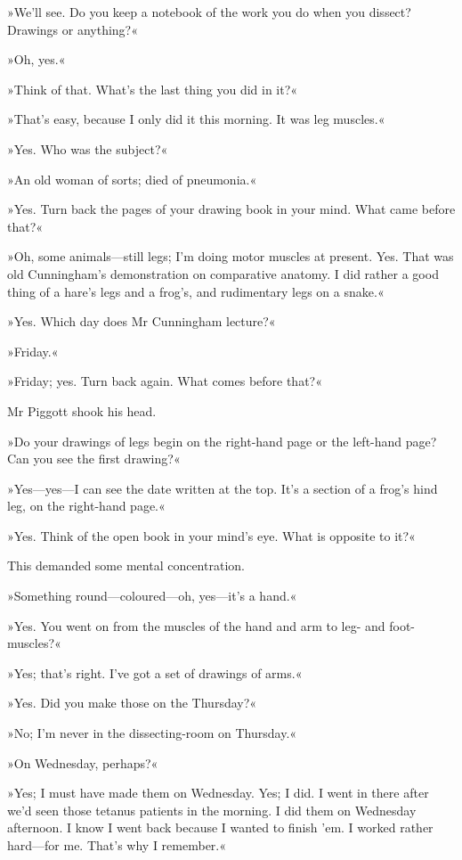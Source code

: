 »We'll see. Do you keep a notebook of the work you do when you dissect? Drawings or anything?«

»Oh, yes.«

»Think of that. What's the last thing you did in it?«

»That's easy, because I only did it this morning. It was leg muscles.«

»Yes. Who was the subject?«

»An old woman of sorts; died of pneumonia.«

»Yes. Turn back the pages of your drawing book in your mind. What came before that?«

»Oh, some animals—still legs; I'm doing motor muscles at present. Yes. That was old Cunningham's demonstration on comparative anatomy. I did rather a good thing of a hare's legs and a frog's, and rudimentary legs on a snake.«

»Yes. Which day does Mr Cunningham lecture?«

»Friday.«

»Friday; yes. Turn back again. What comes before that?«

Mr Piggott shook his head.

»Do your drawings of legs begin on the right-hand page or the left-hand page? Can you see the first drawing?«

»Yes—yes---I can see the date written at the top. It's a section of a frog's hind leg, on the right-hand page.«

»Yes. Think of the open book in your mind's eye. What is opposite to it?«

This demanded some mental concentration.

»Something round—coloured---oh, yes—it's a hand.«

»Yes. You went on from the muscles of the hand and arm to leg- and foot-muscles?«

»Yes; that's right. I've got a set of drawings of arms.«

»Yes. Did you make those on the Thursday?«

»No; I'm never in the dissecting-room on Thursday.«

»On Wednesday, perhaps?«

»Yes; I must have made them on Wednesday. Yes; I did. I went in there after we'd seen those tetanus patients in the morning. I did them on Wednesday afternoon. I know I went back because I wanted to finish 'em. I worked rather hard—for me. That's why I remember.«

